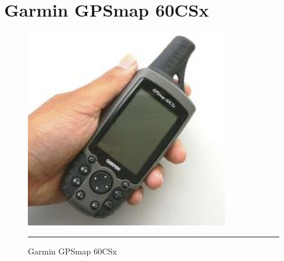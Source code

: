 \chapter{Garmin GPSmap 60CSx}
\label{AppendixC}

\begin{figure}[htbp]
  \centering
    \includegraphics{./Primitives/gpsmap60csx.png}
    \rule{35em}{0.5pt}
  \caption[Garmin GPSmap 60CSx]{Garmin GPSmap 60CSx}
\end{figure}

